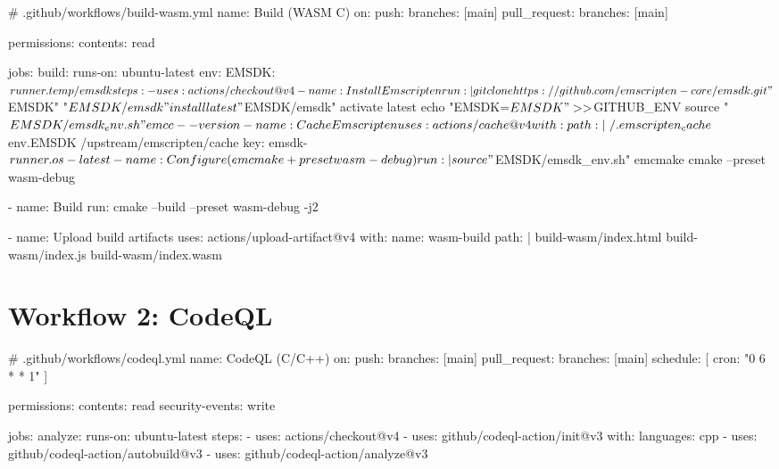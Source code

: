\documentclass[11pt]{article}
\begin{document}
\begin{yamlcode}
# .github/workflows/build-wasm.yml
name: Build (WASM C)
on:
  push: { branches: [main] }
  pull_request: { branches: [main] }

permissions:
  contents: read

jobs:
  build:
    runs-on: ubuntu-latest
    env:
      EMSDK: ${{ runner.temp }}/emsdk

    steps:
      - uses: actions/checkout@v4

      - name: Install Emscripten
        run: |
          git clone https://github.com/emscripten-core/emsdk.git "$EMSDK"
          "$EMSDK/emsdk" install latest
          "$EMSDK/emsdk" activate latest
          echo "EMSDK=$EMSDK" >> $GITHUB_ENV
          source "$EMSDK/emsdk_env.sh"
          emcc --version

      - name: Cache Emscripten
        uses: actions/cache@v4
        with:
          path: |
            ~/.emscripten_cache
            ${{ env.EMSDK }}/upstream/emscripten/cache
          key: emsdk-${{ runner.os }}-latest

      - name: Configure (emcmake + preset wasm-debug)
        run: |
          source "$EMSDK/emsdk_env.sh"
          emcmake cmake --preset wasm-debug

      - name: Build
        run: cmake --build --preset wasm-debug -j2

      - name: Upload build artifacts
        uses: actions/upload-artifact@v4
        with:
          name: wasm-build
          path: |
            build-wasm/index.html
            build-wasm/index.js
            build-wasm/index.wasm
\end{yamlcode}

\section{Workflow 2: CodeQL}

\begin{yamlcode}
# .github/workflows/codeql.yml
name: CodeQL (C/C++)
on:
  push: { branches: [main] }
  pull_request: { branches: [main] }
  schedule: [{ cron: "0 6 * * 1" }]

permissions:
  contents: read
  security-events: write

jobs:
  analyze:
    runs-on: ubuntu-latest
    steps:
      - uses: actions/checkout@v4
      - uses: github/codeql-action/init@v3
        with:
          languages: cpp
      - uses: github/codeql-action/autobuild@v3
      - uses: github/codeql-action/analyze@v3
\end{yamlcode}
\end{document}
